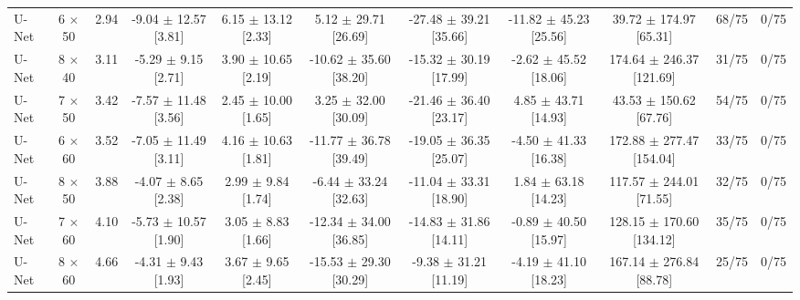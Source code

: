 \begin{tabular}{lcccccccccc}
U-Net & 6 $\times$ 50 & 2.94 & -9.04 $\pm$ 12.57 [3.81] & 6.15 $\pm$ 13.12 [2.33] & 5.12 $\pm$ 29.71 [26.69] & -27.48 $\pm$ 39.21 [35.66] & -11.82 $\pm$ 45.23 [25.56] & 39.72 $\pm$ 174.97 [65.31] & 68/75 & 0/75 \\
U-Net & 8 $\times$ 40 & 3.11 & -5.29 $\pm$ 9.15 [2.71] & 3.90 $\pm$ 10.65 [2.19] & -10.62 $\pm$ 35.60 [38.20] & -15.32 $\pm$ 30.19 [17.99] & -2.62 $\pm$ 45.52 [18.06] & 174.64 $\pm$ 246.37 [121.69] & 31/75 & 0/75 \\
U-Net & 7 $\times$ 50 & 3.42 & -7.57 $\pm$ 11.48 [3.56] & 2.45 $\pm$ 10.00 [1.65] & 3.25 $\pm$ 32.00 [30.09] & -21.46 $\pm$ 36.40 [23.17] & 4.85 $\pm$ 43.71 [14.93] & 43.53 $\pm$ 150.62 [67.76] & 54/75 & 0/75 \\
U-Net & 6 $\times$ 60 & 3.52 & -7.05 $\pm$ 11.49 [3.11] & 4.16 $\pm$ 10.63 [1.81] & -11.77 $\pm$ 36.78 [39.49] & -19.05 $\pm$ 36.35 [25.07] & -4.50 $\pm$ 41.33 [16.38] & 172.88 $\pm$ 277.47 [154.04] & 33/75 & 0/75 \\
U-Net & 8 $\times$ 50 & 3.88 & -4.07 $\pm$ 8.65 [2.38] & 2.99 $\pm$ 9.84 [1.74] & -6.44 $\pm$ 33.24 [32.63] & -11.04 $\pm$ 33.31 [18.90] & 1.84 $\pm$ 63.18 [14.23] & 117.57 $\pm$ 244.01 [71.55] & 32/75 & 0/75 \\
U-Net & 7 $\times$ 60 & 4.10 & -5.73 $\pm$ 10.57 [1.90] & 3.05 $\pm$ 8.83 [1.66] & -12.34 $\pm$ 34.00 [36.85] & -14.83 $\pm$ 31.86 [14.11] & -0.89 $\pm$ 40.50 [15.97] & 128.15 $\pm$ 170.60 [134.12] & 35/75 & 0/75 \\
U-Net & 8 $\times$ 60 & 4.66 & -4.31 $\pm$ 9.43 [1.93] & 3.67 $\pm$ 9.65 [2.45] & -15.53 $\pm$ 29.30 [30.29] & -9.38 $\pm$ 31.21 [11.19] & -4.19 $\pm$ 41.10 [18.23] & 167.14 $\pm$ 276.84 [88.78] & 25/75 & 0/75 \\
\hline
\end{tabular}
